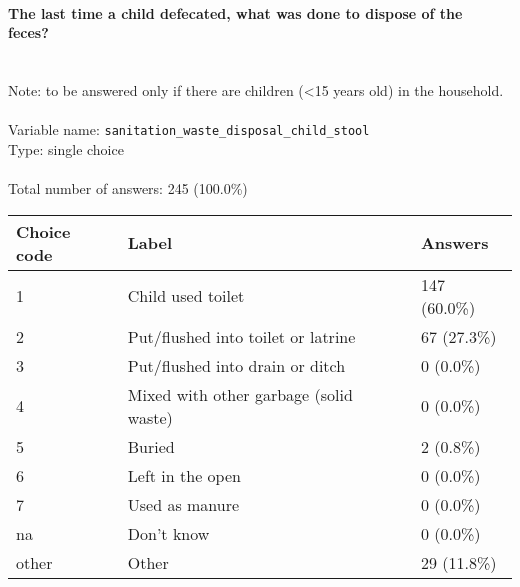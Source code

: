 \documentclass[11.5pt, a4paper]{scrartcl}
\begin{document}
\paragraph{The last time a child defecated, what was done to dispose of the feces? }
\ \\ {\small Note: to be answered only if there are children (<15 years old) in the household.}
\  \\Variable name: \texttt{sanitation\_waste\_disposal\_child\_stool}\\
Type: single choice\\
\\Total number of answers: 245 (100.0\%)
\\[0.2em] \begin{tabular}{p{4cm}|p{8cm}|p{3cm}}
Choice code & Label & Answers \\
\hline
1 & Child used toilet& \cellcolor{color2}147 (60.0\%)\\
\cellcolor{mygray} 2 & \cellcolor{mygray}Put/flushed into toilet or latrine  & \cellcolor{color1}67 (27.3\%)\\
3 & Put/flushed into drain or ditch & \cellcolor{color0}0 (0.0\%)\\
\cellcolor{mygray} 4 & \cellcolor{mygray}Mixed with other garbage (solid waste)  & \cellcolor{color0}0 (0.0\%)\\
5 & Buried & \cellcolor{color0}2 (0.8\%)\\
\cellcolor{mygray} 6 & \cellcolor{mygray}Left in the open  & \cellcolor{color0}0 (0.0\%)\\
7 & Used as manure & \cellcolor{color0}0 (0.0\%)\\
\cellcolor{mygray} na & \cellcolor{mygray}Don’t know  & \cellcolor{color0}0 (0.0\%)\\
other & Other & \cellcolor{color0}29 (11.8\%)\\
\end{tabular}
\end{document}
